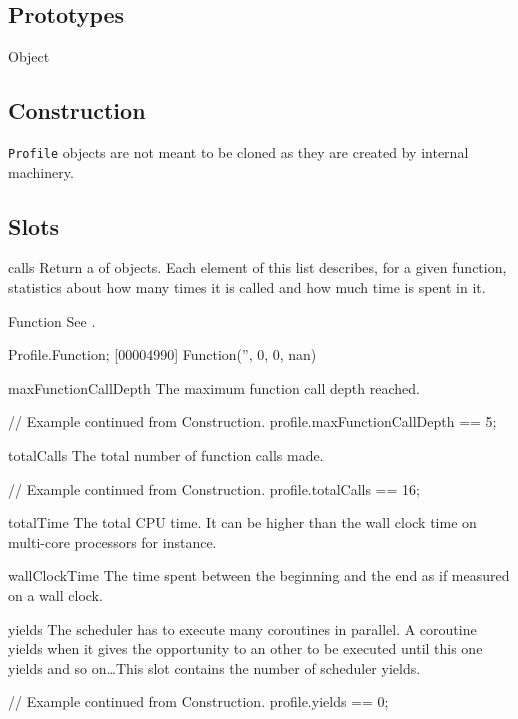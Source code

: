 \subsection{Prototypes}

\begin{refObjects}
\item[Object]
\end{refObjects}

\subsection{Construction}

\lstinline|Profile| objects are not meant to be cloned as they are created
by  internal machinery.

\subsection{Slots}

\begin{urbiscriptapi}
\item[calls]%
  Return a  of  objects. Each
  element of this list describes, for a given function, statistics about how
  many times it is called and how much time is spent in it.


\item[Function]
  See .
\begin{urbiscript}
Profile.Function;
[00004990] Function('', 0, 0, nan)
\end{urbiscript}


\item[maxFunctionCallDepth]%
  The maximum function call depth reached.
\begin{urbiassert}
// Example continued from Construction.
profile.maxFunctionCallDepth == 5;
\end{urbiassert}


\item[totalCalls]%
  The total number of function calls made.
\begin{urbiassert}
// Example continued from Construction.
profile.totalCalls == 16;
\end{urbiassert}


\item[totalTime]%
  The total CPU time. It can be higher than the wall clock time on
  multi-core processors for instance.


\item[wallClockTime]%
  The time spent between the beginning and the end as if measured on a wall
  clock.


\item[yields]%
  The scheduler has to execute many coroutines in parallel. A coroutine
  yields when it gives the opportunity to an other to be executed until this
  one yields and so on\dots This slot contains the number of scheduler
  yields.
\begin{urbiassert}
// Example continued from Construction.
profile.yields == 0;
\end{urbiassert}
\end{urbiscriptapi}


